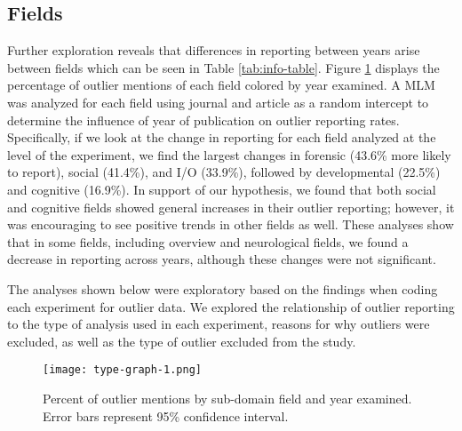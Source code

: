 \documentclass[english,,man]{apa6}
\theoremstyle{definition}
\theoremstyle{definition}
\theoremstyle{definition}
\theoremstyle{remark}
\begin{document}
\subsection{Fields}\label{fields-1}

Further exploration reveals that differences in reporting between years
arise between fields which can be seen in Table \ref{tab:info-table}.
Figure \ref{fig:type-graph} displays the percentage of outlier mentions
of each field colored by year examined. A MLM was analyzed for each
field using journal and article as a random intercept to determine the
influence of year of publication on outlier reporting rates.
Specifically, if we look at the change in reporting for each field
analyzed at the level of the experiment, we find the largest changes in
forensic (43.6\% more likely to report), social (41.4\%), and I/O
(33.9\%), followed by developmental (22.5\%) and cognitive (16.9\%). In
support of our hypothesis, we found that both social and cognitive
fields showed general increases in their outlier reporting; however, it
was encouraging to see positive trends in other fields as well. These
analyses show that in some fields, including overview and neurological
fields, we found a decrease in reporting across years, although these
changes were not significant.

The analyses shown below were exploratory based on the findings when
coding each experiment for outlier data. We explored the relationship of
outlier reporting to the type of analysis used in each experiment,
reasons for why outliers were excluded, as well as the type of outlier
excluded from the study.

\begin{figure}
\centering
\texttt{[image: type-graph-1.png]}
\caption{\label{fig:type-graph}Percent of outlier mentions by sub-domain
field and year examined. Error bars represent 95\% confidence interval.}
\end{figure}
\end{document}
